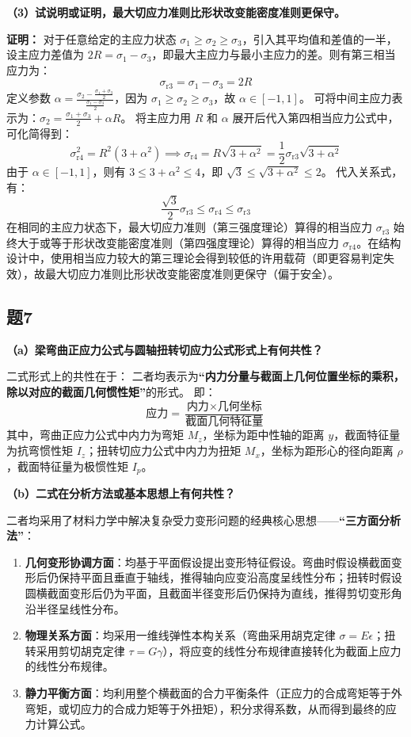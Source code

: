 \documentclass[UTF8,fontset=windows]{ctexart}
\begin{document}
\textbf{（3）试说明或证明，最大切应力准则比形状改变能密度准则更保守。}

\textbf{证明：}
对于任意给定的主应力状态 $\sigma_1 \ge \sigma_2 \ge \sigma_3$，引入其平均值和差值的一半，设主应力差值为 $2R = \sigma_1 - \sigma_3$，即最大主应力与最小主应力的差。则有第三相当应力为：
\[
    \sigma_{\text{r3}} = \sigma_1 - \sigma_3 = 2R
\]
定义参数 $\alpha = \frac{\sigma_2 - \frac{\sigma_1 + \sigma_3}{2}}{\frac{\sigma_1 - \sigma_3}{2}}$，因为 $\sigma_1 \ge \sigma_2 \ge \sigma_3$，故 $\alpha \in [-1, 1]$。
可将中间主应力表示为：$\sigma_2 = \frac{\sigma_1 + \sigma_3}{2} + \alpha R$。
将主应力用 $R$ 和 $\alpha$ 展开后代入第四相当应力公式中，可化简得到：
\[
    \sigma_{\text{r4}}^2 = R^2 (3 + \alpha^2) \implies \sigma_{\text{r4}} = R\sqrt{3 + \alpha^2} = \frac{1}{2}\sigma_{\text{r3}}\sqrt{3+\alpha^2}
\]
由于 $\alpha \in [-1, 1]$，则有 $3 \le 3 + \alpha^2 \le 4$，即 $\sqrt{3} \le \sqrt{3 + \alpha^2} \le 2$。
代入关系式，有：
\[
    \frac{\sqrt{3}}{2} \sigma_{\text{r3}} \le \sigma_{\text{r4}} \le \sigma_{\text{r3}}
\]
在相同的主应力状态下，最大切应力准则（第三强度理论）算得的相当应力 $\sigma_{\text{r3}}$ 始终大于或等于形状改变能密度准则（第四强度理论）算得的相当应力 $\sigma_{\text{r4}}$。在结构设计中，使用相当应力较大的第三理论会得到较低的许用载荷（即更容易判定失效），故最大切应力准则比形状改变能密度准则更保守（偏于安全）。

\subsection*{题7}
\textbf{（a）梁弯曲正应力公式与圆轴扭转切应力公式形式上有何共性？}

二式形式上的共性在于：
二者均表示为\textbf{“内力分量与截面上几何位置坐标的乘积，除以对应的截面几何惯性矩”}的形式。
即：
\[
    \text{应力} = \frac{\text{内力} \times \text{几何坐标}}{\text{截面几何特征量}}
\]
其中，弯曲正应力公式中内力为弯矩 $M_z$，坐标为距中性轴的距离 $y$，截面特征量为抗弯惯性矩 $I_z$；扭转切应力公式中内力为扭矩 $M_x$，坐标为距形心的径向距离 $\rho$，截面特征量为极惯性矩 $I_p$。

\textbf{（b）二式在分析方法或基本思想上有何共性？}

二者均采用了材料力学中解决复杂受力变形问题的经典核心思想——\textbf{“三方面分析法”}：
\begin{enumerate}
    \item \textbf{几何变形协调方面}：均基于平面假设提出变形特征假设。弯曲时假设横截面变形后仍保持平面且垂直于轴线，推得轴向应变沿高度呈线性分布；扭转时假设圆横截面变形后仍为平面，且截面半径变形后仍保持为直线，推得剪切变形角沿半径呈线性分布。
    \item \textbf{物理关系方面}：均采用一维线弹性本构关系（弯曲采用胡克定律 $\sigma = E \epsilon$；扭转采用剪切胡克定律 $\tau = G \gamma$），将应变的线性分布规律直接转化为截面上应力的线性分布规律。
    \item \textbf{静力平衡方面}：均利用整个横截面的合力平衡条件（正应力的合成弯矩等于外弯矩，或切应力的合成力矩等于外扭矩），积分求得系数，从而得到最终的应力计算公式。
\end{enumerate}
\end{document}
